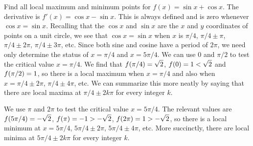 \begin{example}
\label{example:max and min}
Find all local maximum and minimum points for 
$f(x)=\sin x+\cos x$. The derivative is $f'(x)=\cos x-\sin x$. This is
always defined and is zero whenever $\cos x=\sin x$. Recalling that
the $\cos x$ and $\sin x$ are the $x$ and $y$ coordinates of points on
a unit circle, we see that $\cos x=\sin x$ when $x$ is $\pi/4$, 
$\pi/4\pm\pi$, $\pi/4\pm2\pi$, $\pi/4\pm3\pi$, etc. Since both sine
and cosine have a period of $2\pi$, we need only determine the status
of $x=\pi/4$ and $x=5\pi/4$. We can use $0$ and $\pi/2$ to test the
critical value $x= \pi/4$. 
We find that $\displaystyle f(\pi/4)=\sqrt{2}$, $\displaystyle f(0)=1<\sqrt{2}$ and $\displaystyle f(\pi/2)=1$,
so there is a local maximum when $x=\pi/4$ and also when
$x=\pi/4\pm2\pi$, $\pi/4\pm4\pi$, etc. We can summarize this more
neatly by saying that there are local maxima at $\pi/4\pm 2k\pi$ for
every integer $k$.

We use $\pi$ and $2\pi$ to test the critical value $x=5\pi/4$. The
relevant values are $\displaystyle f(5\pi/4)=-\sqrt2$, $\displaystyle f(\pi)=-1>-\sqrt2$,
$\displaystyle f(2\pi)=1>-\sqrt2$, so there is a local minimum at $x=5\pi/4$,
$5\pi/4\pm2\pi$, $5\pi/4\pm4\pi$, etc. More succinctly, there are
local minima at $5\pi/4\pm 2k\pi$ for
every integer $k$.
\end{example}


